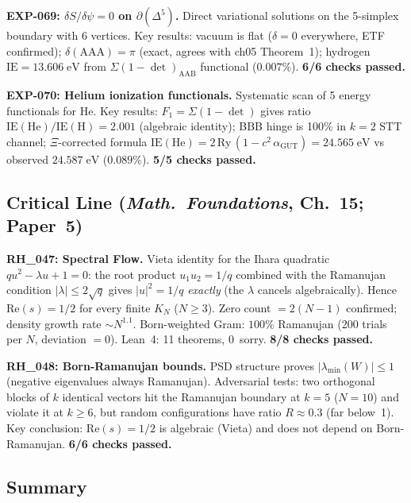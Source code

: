 \documentclass[12pt]{article}
\theoremstyle{remark}
\theoremstyle{definition}
\begin{document}
\textbf{EXP-069: $\delta S/\delta\psi = 0$ on $\partial(\Delta^5)$.}  Direct variational solutions on the 5-simplex boundary with 6 vertices. Key results: vacuum is flat ($\delta = 0$ everywhere, ETF confirmed); $\delta(\text{AAA}) = \pi$ (exact, agrees with ch05 Theorem~1); hydrogen $\text{IE} = 13.606\;\text{eV}$ from $\Sigma(1-\det)_\text{AAB}$ functional ($0.007\%$). \textbf{6/6 checks passed.}

\textbf{EXP-070: Helium ionization functionals.}  Systematic scan of 5 energy functionals for He. Key results: $F_1 = \Sigma(1-\det)$ gives ratio $\text{IE}(\text{He})/\text{IE}(\text{H}) = 2.001$ (algebraic identity); BBB hinge is 100\% in $k=2$ STT channel; $\Xi$-corrected formula $\text{IE}(\text{He}) = 2\,\text{Ry}\,(1 - c^2\,\alpha_\text{GUT}) = 24.565\;\text{eV}$ vs observed $24.587\;\text{eV}$ ($0.089\%$). \textbf{5/5 checks passed.}

\subsection{Critical Line (\textit{Math.~Foundations}, Ch.~15; Paper~5)}

\textbf{RH\_047: Spectral Flow.}  Vieta identity for the Ihara quadratic $qu^2 - \lambda u + 1 = 0$: the root product $u_1 u_2 = 1/q$ combined with the Ramanujan condition $|\lambda| \leq 2\sqrt{q}$ gives $|u|^2 = 1/q$ \emph{exactly} (the $\lambda$ cancels algebraically).  Hence $\mathrm{Re}(s) = 1/2$ for every finite $K_N$ ($N \geq 3$).  Zero count $= 2(N-1)$ confirmed; density growth rate $\sim N^{1.1}$.  Born-weighted Gram: $100\%$ Ramanujan (200 trials per $N$, deviation $= 0$).  Lean~4: 11 theorems, 0~sorry.  \textbf{8/8 checks passed.}

\textbf{RH\_048: Born-Ramanujan bounds.}  PSD structure proves $|\lambda_{\min}(W)| \leq 1$ (negative eigenvalues always Ramanujan).  Adversarial tests: two orthogonal blocks of $k$ identical vectors hit the Ramanujan boundary at $k = 5$ ($N = 10$) and violate it at $k \geq 6$, but random configurations have ratio $R \approx 0.3$ (far below~1).  Key conclusion: $\mathrm{Re}(s) = 1/2$ is algebraic (Vieta) and does not depend on Born-Ramanujan.  \textbf{6/6 checks passed.}

\subsection{Summary}
\end{document}
